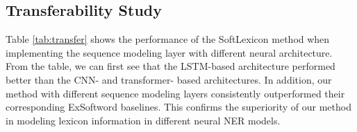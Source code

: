 \documentclass[11pt,a4paper]{article}
\begin{document}
\begin{CJK}{UTF8}{gbsn}
\subsection{Transferability Study}




\begin{table}[t]
    \centering
    \caption{F1 score with different implementations of the sequence modeling layer. ExSoftword is the shorthand of Char-based+bichar+ExSoftword.}
    \label{tab:transfer}
\end{table}






Table \ref{tab:transfer} shows the performance of the SoftLexicon method when implementing the sequence modeling layer with different neural architecture. From the table, we can first see that the LSTM-based architecture performed better than the CNN- and transformer- based architectures. In addition, our method with different sequence modeling layers consistently outperformed their corresponding ExSoftword baselines. This confirms the superiority of our method in modeling lexicon information in different neural NER models.



\end{CJK}
\end{document}
